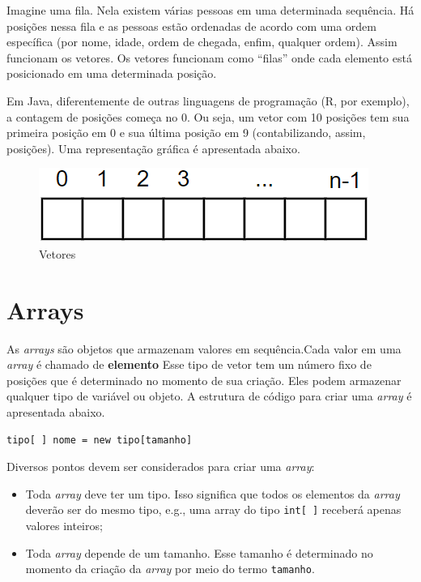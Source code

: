\documentclass[
]{book}
\providecommand{\tightlist}{%
  \setlength{\itemsep}{0pt}\setlength{\parskip}{0pt}}
\begin{document}
Imagine uma fila. Nela existem várias pessoas em uma determinada sequência. Há posições nessa fila e as pessoas estão ordenadas de acordo com uma ordem específica (por nome, idade, ordem de chegada, enfim, qualquer ordem). Assim funcionam os vetores. Os vetores funcionam como ``filas'' onde cada elemento está posicionado em uma determinada posição.

Em Java, diferentemente de outras linguagens de programação (R, por exemplo), a contagem de posições começa no 0. Ou seja, um vetor com 10 posições tem sua primeira posição em 0 e sua última posição em 9 (contabilizando, assim, posições). Uma representação gráfica é apresentada abaixo.

\begin{figure}
\centering
\includegraphics{imagens/vetores.png}
\caption{Vetores}
\end{figure}

\hypertarget{arrays}{%
\section{Arrays}\label{arrays}}

As \emph{arrays} são objetos que armazenam valores em sequência.Cada valor em uma \emph{array} é chamado de \textbf{elemento} Esse tipo de vetor tem um número fixo de posições que é determinado no momento de sua criação. Eles podem armazenar qualquer tipo de variável ou objeto. A estrutura de código para criar uma \emph{array} é apresentada abaixo.

\begin{verbatim}
tipo[ ] nome = new tipo[tamanho]
\end{verbatim}

Diversos pontos devem ser considerados para criar uma \emph{array}:

\begin{itemize}
\tightlist
\item
  Toda \emph{array} deve ter um tipo. Isso significa que todos os elementos da \emph{array} deverão ser do mesmo tipo, e.g., uma array do tipo \texttt{int{[}\ {]}} receberá apenas valores inteiros;
\item
  Toda \emph{array} depende de um tamanho. Esse tamanho é determinado no momento da criação da \emph{array} por meio do termo \texttt{tamanho}.
\end{itemize}
\end{document}

